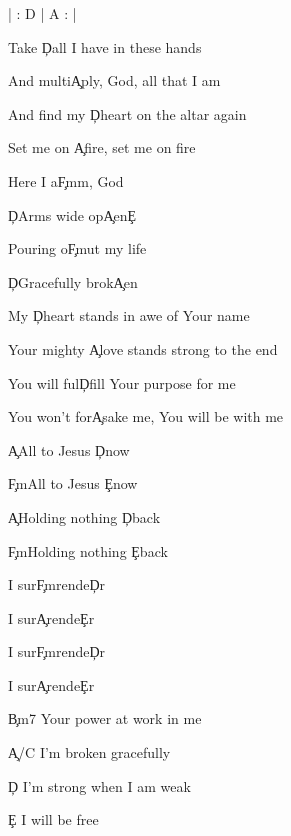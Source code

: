 \documentclass[9pt]{extarticle}
\begin{document}
\bsong

\bi
| : D | A : |
\ei

\bv[2]
Take \c{D}all I have in these hands

And multi\c{A}ply, God, all that I am

And find my \c{D}heart on the altar again

Set me on \c{A}fire, set me on fire
\ev

\bc
Here I a\c{F\s m}m, God

\c{D}Arms wide op\c{A}en\c{E}

Pouring o\c{F\s m}ut my life

\c{D}Gracefully brok\c{A}en
\ec

\bv
My \c{D}heart stands in awe of Your name

Your mighty \c{A}love stands strong to the end

You will ful\c{D}fill Your purpose for me

You won't for\c{A}sake me, You will be with me
\ev


\bb[2]
\c{A}All to Jesus \c{D}now

\c{F\s m}All to Jesus \c{E}now

\c{A}Holding nothing \c{D}back

\c{F\s m}Holding nothing \c{E}back
\eb

\bb[2]
I sur\c{F\s m}rende\c{D}r

I sur\c{A}rende\c{E}r

I sur\c{F\s m}rende\c{D}r

I sur\c{A}rende\c{E}r
\eb


\bb[2]
\c{Bm7} Your power at work in me

\c{A/C\s } I'm broken gracefully

\c{D} I'm strong when I am weak

\c{E} I will be free
\eb


\esong
\end{document}
